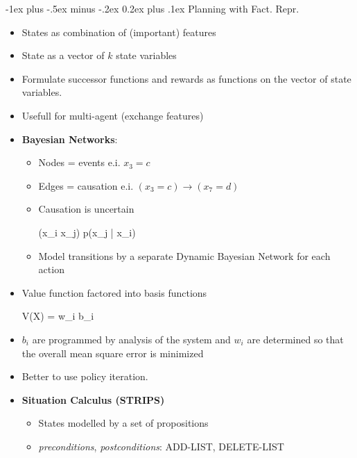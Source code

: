 \documentclass[10pt,a4paper,landscape]{article}
\makeatletter
\renewcommand{\section}{\@startsection{section}{1}{0mm}%
                                {-1ex plus -.5ex minus -.2ex}%
                                {0.2ex plus .1ex}%
                                {\normalfont\tiny\bfseries}}
\newenvironment{myalign*}{%
  \setlength{\abovedisplayskip}{2pt}%
  \setlength{\belowdisplayskip}{2pt}%
  \start@align\@ne\st@rredtrue\m@ne
}%
{\endalign}
\makeatother
\begin{document}
\begin{multicols*}{5}

\section{Planning with Fact. Repr.}
\begin{itemize}
	\item States as combination of (important) features 
	\item State as a vector of $k$ state variables
	\item Formulate successor functions and rewards as functions on the vector of state variables.
	\item Usefull for multi-agent (exchange features)
	\item \textbf{Bayesian Networks}:
	\begin{itemize}
		\item Nodes = events e.i. $x_3 = c$ 
		\item Edges = causation e.i. $(x_3 = c) \rightarrow (x_7 = d)$
		\item Causation is uncertain
		\begin{myalign*}
		    (x_i \rightarrow x_j) \Rightarrow p(x_j | x_i)
		\end{myalign*}
		\item Model transitions by a separate Dynamic Bayesian Network for each action
	\end{itemize}
	\item Value function factored into basis functions
	\begin{myalign*}
	    V(X) = \sum w_i b_i
	\end{myalign*}
	\item $b_i$ are programmed by analysis of the system and $w_i$ are determined so that the overall mean square error is minimized
	\item Better to use policy iteration.
	\item \textbf{Situation Calculus (STRIPS)}
	\begin{itemize}
		\item States modelled by a set of propositions
		\item \textit{preconditions}, \textit{postconditions}: ADD-LIST, DELETE-LIST
	\end{itemize}
\end{itemize}


\end{multicols*}
\end{document}
